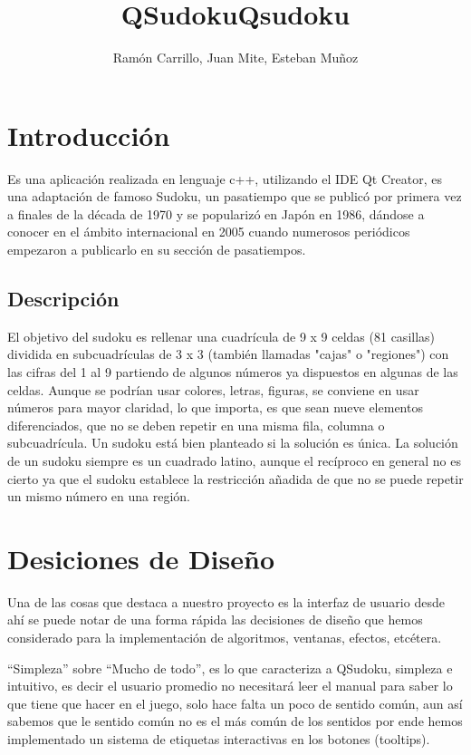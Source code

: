 \documentclass[a4paper,11pt]{article}
\title{QSudoku}
\title{Qsudoku}
\author{Ramón Carrillo, Juan Mite, Esteban Muñoz}
\begin{document}
\maketitle
\tableofcontents

\section{Introducción}
Es una aplicación realizada en lenguaje c++, utilizando el IDE Qt Creator, es una adaptación de famoso Sudoku, un pasatiempo que se publicó por primera vez a finales de la década de 1970 y se popularizó en Japón en 1986, dándose a conocer en el ámbito internacional en 2005 cuando numerosos periódicos empezaron a publicarlo en su sección de pasatiempos.

\subsection{Descripción}

El objetivo del sudoku es rellenar una cuadrícula de 9 x 9 celdas (81 casillas) dividida en subcuadrículas de 3 x 3 (también llamadas "cajas" o "regiones") con las cifras del 1 al 9 partiendo de algunos números ya dispuestos en algunas de las celdas. Aunque se podrían usar colores, letras, figuras, se conviene en usar números para mayor claridad, lo que importa, es que sean nueve elementos diferenciados, que no se deben repetir en una misma fila, columna o subcuadrícula. Un sudoku está bien planteado si la solución es única. La solución de un sudoku siempre es un cuadrado latino, aunque el recíproco en general no es cierto ya que el sudoku establece la restricción añadida de que no se puede repetir un mismo número en una región. 

\section{Desiciones de Diseño}
	Una de las cosas que destaca a nuestro proyecto es la interfaz de usuario desde ahí se puede notar de una forma rápida las decisiones de diseño que hemos considerado para la implementación de algoritmos, ventanas, efectos, etcétera.

	“Simpleza” sobre “Mucho de todo”, es lo que caracteriza a QSudoku, simpleza e intuitivo, es decir el usuario promedio no necesitará leer el manual para saber lo que tiene que hacer en el juego, solo hace falta un poco de sentido común, aun así sabemos que le sentido común no es el más común de los sentidos por ende hemos implementado un sistema de etiquetas interactivas en los botones (tooltips).
\end{document}
